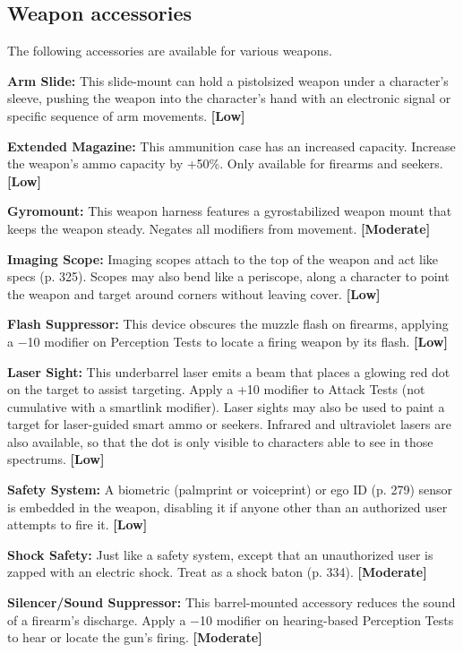 \subsection{Weapon accessories} \label{sec:weapon-accessories} 

The following accessories are available for various weapons. 

\textbf{Arm Slide:} This slide-mount can hold a pistolsized weapon under a character’s sleeve, pushing the weapon into the character’s hand with an electronic signal or specific sequence of arm movements. \textbf{[Low]} 

\textbf{Extended Magazine:} This ammunition case has an increased capacity. Increase the weapon’s ammo capacity by +50\%. Only available for firearms and seekers. \textbf{[Low]} 

\textbf{Gyromount:} This weapon harness features a gyrostabilized weapon mount that keeps the weapon steady. Negates all modifiers from movement. \textbf{[Moderate]} 

\textbf{Imaging Scope:} Imaging scopes attach to the top of the weapon and act like specs (p. 325). Scopes may also bend like a periscope, along a character to point the weapon and target around corners without leaving cover. \textbf{[Low]} 

\textbf{Flash Suppressor:} This device obscures the muzzle flash on firearms, applying a $-$10 modifier on Perception Tests to locate a firing weapon by its flash. \textbf{[Low]} 

\textbf{Laser Sight:} This underbarrel laser emits a beam that places a glowing red dot on the target to assist targeting. Apply a +10 modifier to Attack Tests (not cumulative with a smartlink modifier). Laser sights may also be used to paint a target for laser-guided smart ammo or seekers. Infrared and ultraviolet lasers are also available, so that the dot is only visible to characters able to see in those spectrums. \textbf{[Low]} 

\textbf{Safety System:} A biometric (palmprint or voiceprint) or ego ID (p. 279) sensor is embedded in the weapon, disabling it if anyone other than an authorized user attempts to fire it. \textbf{[Low]} 

\textbf{Shock Safety:} Just like a safety system, except that an unauthorized user is zapped with an electric shock. Treat as a shock baton (p. 334). \textbf{[Moderate]} 

\textbf{Silencer/Sound Suppressor:} This barrel-mounted accessory reduces the sound of a firearm’s discharge. Apply a $-$10 modifier on hearing-based Perception Tests to hear or locate the gun’s firing. \textbf{[Moderate]} 

